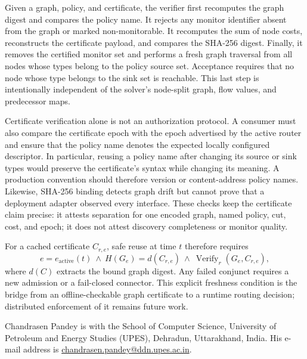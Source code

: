 \documentclass[10pt,journal,compsoc]{IEEEtran}
\begin{document}
Given a graph, policy, and certificate, the verifier first recomputes the graph
digest and compares the policy name.  It rejects any monitor identifier absent
from the graph or marked non-monitorable.  It recomputes the sum of node costs,
reconstructs the certificate payload, and compares the SHA-256 digest.  Finally,
it removes the certified monitor set and performs a fresh graph traversal from
all nodes whose types belong to the policy source set.  Acceptance requires
that no node whose type belongs to the sink set is reachable.  This last step
is intentionally independent of the solver's node-split graph, flow values,
and predecessor maps.

Certificate verification alone is not an authorization protocol.  A consumer
must also compare the certificate epoch with the epoch advertised by the active
router and ensure that the policy name denotes the expected locally configured
descriptor.  In particular, reusing a policy name after changing its source or
sink types would preserve the certificate's syntax while changing its meaning.
A production convention should therefore version or content-address policy
names.  Likewise, SHA-256 binding detects graph drift but cannot prove that a
deployment adapter observed every interface.  These checks keep the certificate
claim precise: it attests separation for one encoded graph, named policy, cut,
cost, and epoch; it does not attest discovery completeness or monitor quality.

For a cached certificate $C_{r,e}$, safe reuse at time $t$ therefore requires
\begin{equation}
e=e_{\mathrm{active}}(t)\ \wedge\ H(G_e)=d(C_{r,e})\ \wedge\
\operatorname{Verify}_r(G_e,C_{r,e}),
\label{eq:reuse}
\end{equation}
where $d(C)$ extracts the bound graph digest.  Any failed conjunct requires a
new admission or a fail-closed connector.  This explicit freshness condition
is the bridge from an offline-checkable graph certificate to a runtime routing
decision; distributed enforcement of it remains future work.




\begin{IEEEbiographynophoto}{Chandrasen Pandey}
is with the School of Computer Science, University of Petroleum and Energy
Studies (UPES), Dehradun, Uttarakhand, India. His e-mail address is
\href{mailto:chandrasen.pandey@ddn.upes.ac.in}{chandrasen.pandey@ddn.upes.ac.in}.
\end{IEEEbiographynophoto}
\end{document}
